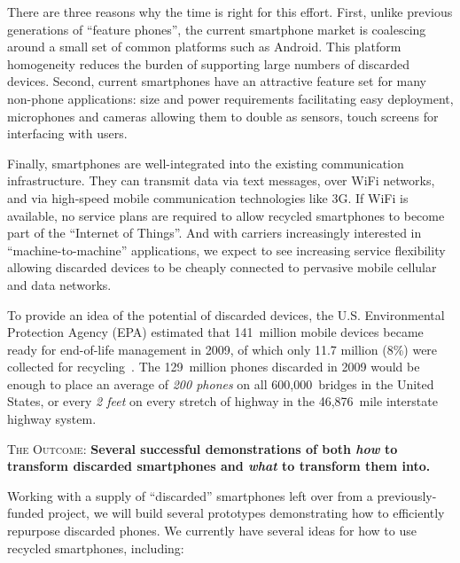 There are three reasons why the time is right for this effort. First, unlike
previous generations of ``feature phones'', the current smartphone market is
coalescing around a small set of common platforms such as Android. This
platform homogeneity reduces the burden of supporting large numbers of
discarded devices. Second, current smartphones have an attractive feature set
for many non-phone applications: size and power requirements facilitating
easy deployment, microphones and cameras allowing them to double as sensors,
touch screens for interfacing with users.

Finally, smartphones are well-integrated into the existing communication
infrastructure. They can transmit data via text messages, over WiFi networks,
and via high-speed mobile communication technologies like 3G. If WiFi is
available, no service plans are required to allow recycled smartphones to
become part of the ``Internet of Things''. And with carriers increasingly
interested in ``machine-to-machine'' applications, we expect to see
increasing service flexibility allowing discarded devices to be cheaply
connected to pervasive mobile cellular and data networks.

To provide an idea of the potential of discarded devices, the U.S.
Environmental Protection Agency (EPA) estimated that 141~million mobile
devices became ready for end-of-life management in 2009, of which only 11.7
million (8\%) were collected for recycling~\cite{epa-ewasteweb}. The
129~million phones discarded in 2009 would be enough to place an average of
\textit{200 phones} on all 600,000~bridges in the United States, or every
\textit{2 feet} on every stretch of highway in the 46,876~mile interstate
highway system.

\vspace*{-0.05in}
\begin{framed}
\textsc{The Outcome:} \textbf{Several successful demonstrations of both
\textit{how} to transform discarded smartphones and \textit{what} to
transform them into.}
\end{framed}
\vspace*{-0.2in}

Working with a supply of ``discarded'' smartphones left over from a
previously-funded project, we will build several prototypes demonstrating how
to efficiently repurpose discarded phones. We currently have several ideas
for how to use recycled smartphones, including:

